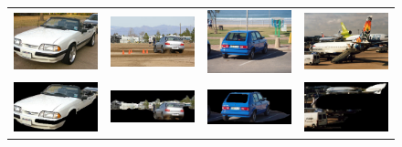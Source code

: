 \documentclass[10pt,twocolumn,letterpaper]{article}
\begin{document}
\begin{figure}[p]
\centering
\begin{tabular}{ p{3cm} p{3cm} p{3cm} p{3cm} }
\includegraphics[width=2.95cm]{figures/add_res/car/2008_007064.jpg.eps} &
\includegraphics[width=2.95cm]{figures/add_res/car/2008_000052.jpg.eps} &
\includegraphics[width=2.95cm]{figures/add_res/car/2008_007171.jpg.eps} &
\includegraphics[width=2.95cm]{figures/add_res/car/2008_000251.jpg.eps} \\

\includegraphics[width=2.95cm]{figures/add_res/car/2008_007064.jpg_1_good.jpg.eps} &
\includegraphics[width=2.95cm]{figures/add_res/car/2008_000052.jpg_1_good.jpg.eps} &
\includegraphics[width=2.95cm]{figures/add_res/car/2008_007171.jpg_1_good.jpg.eps} &
\includegraphics[width=2.95cm]{figures/add_res/car/2008_000251.jpg_1_good.jpg.eps} \\


\end{tabular}
\end{figure}
\end{document}
